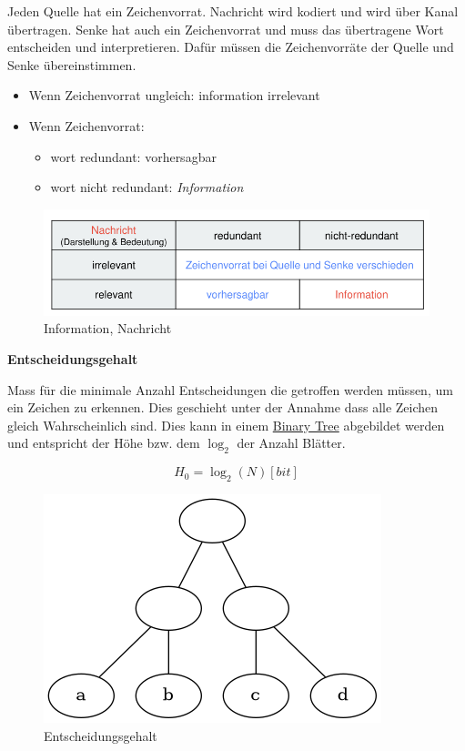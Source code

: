 \documentclass[11pt,twoside,twocolumn,landscape]{article}
\begin{document}
Jeden Quelle hat ein Zeichenvorrat.
Nachricht wird kodiert und wird über Kanal übertragen.
Senke hat auch ein Zeichenvorrat und muss das übertragene Wort entscheiden und interpretieren.
Dafür müssen die Zeichenvorräte der Quelle und Senke übereinstimmen.

\begin{itemize}
\item Wenn Zeichenvorrat ungleich: information irrelevant
\item Wenn Zeichenvorrat:
\begin{itemize}
\item wort redundant: vorhersagbar
\item wort nicht redundant: \emph{Information}
\end{itemize}
\end{itemize}


\begin{figure}[htbp]
\centering
\includegraphics[width=.9\linewidth]{img/informations_uebertragung_information.png}
\caption{\label{fig:orgda8480d}Information, Nachricht}
\end{figure}

\textbf{Entscheidungsgehalt}

Mass für die minimale Anzahl Entscheidungen die getroffen werden müssen, um ein Zeichen zu erkennen.
Dies geschieht unter der Annahme dass alle Zeichen gleich Wahrscheinlich sind.
Dies kann in einem \href{../../../roam/20210806225200-binary_tree.org}{Binary Tree} abgebildet werden und entspricht der Höhe bzw. dem \(\log_2\) der Anzahl Blätter.

\begin{equation}
H_0 = \log_2(N)[bit]
\end{equation}

\begin{figure}[htbp]
\centering
\includegraphics[width=.9\linewidth]{img/entscheidungsgehalt_tree.png}
\caption{\label{fig:org9928e34}Entscheidungsgehalt}
\end{figure}
\end{document}
